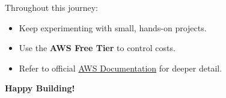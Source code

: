\documentclass[11pt]{article}
\begin{document}
Throughout this journey:
\begin{itemize}
    \item Keep experimenting with small, hands-on projects.
    \item Use the \textbf{AWS Free Tier} to control costs.
    \item Refer to official \href{https://aws.amazon.com/documentation/}{AWS Documentation} for deeper detail.
\end{itemize}

\textbf{Happy Building!}
\end{document}
